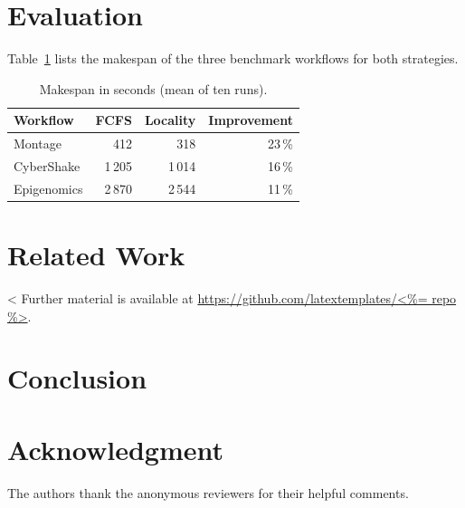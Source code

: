 \section{Evaluation}\label{sec:evaluation}
Table~\ref{tab:results} lists the makespan of the three benchmark workflows for both strategies.
\begin{table}
  \caption{Makespan in seconds (mean of ten runs).}
  \label{tab:results}
  \centering
  \begin{tabular}{lrrr}
    \hline
    Workflow & FCFS & Locality & Improvement \\
    \hline
    Montage & 412 & 318 & 23\,\% \\
    CyberShake & 1\,205 & 1\,014 & 16\,\% \\
    Epigenomics & 2\,870 & 2\,544 & 11\,\% \\
    \hline
  \end{tabular}
\end{table}
\lipsum[10-12]

\section{Related Work}\label{sec:related}
\lipsum[13-14]
<%
Further material is available at \url{https://github.com/latextemplates/<%= repo %>}.

\section{Conclusion}\label{sec:conclusion}
\lipsum[15]

\section*{Acknowledgment}
The authors thank the anonymous reviewers for their helpful comments.
